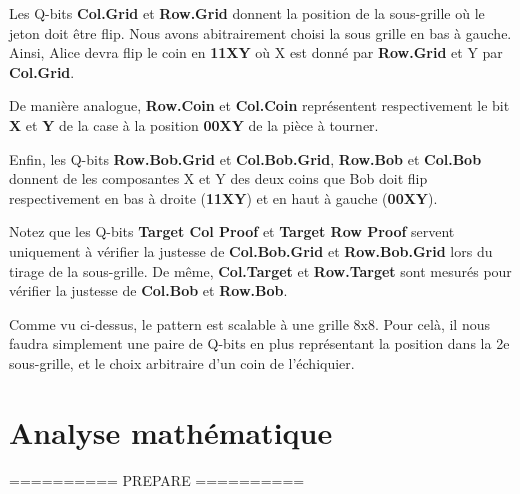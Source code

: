 \documentclass[12pt]{article}
\begin{document}
    \vspace{5mm}

    Les Q-bits \textbf{Col.Grid} et \textbf{Row.Grid} donnent la position de la sous-grille où le jeton doit être flip. Nous avons abitrairement choisi la sous grille en bas à gauche. Ainsi, Alice devra flip le coin en \textbf{11XY} où X est donné par \textbf{Row.Grid} et Y par \textbf{Col.Grid}.

    \vspace{5mm}

    De manière analogue, \textbf{Row.Coin} et \textbf{Col.Coin} représentent respectivement le bit \textbf{X} et \textbf{Y} de la case à la position \textbf{00XY} de la pièce à tourner.

    \vspace{5mm}

    Enfin, les Q-bits \textbf{Row.Bob.Grid} et \textbf{Col.Bob.Grid}, \textbf{Row.Bob} et \textbf{Col.Bob} donnent de les composantes X et Y des deux coins que Bob doit flip respectivement en bas à droite (\textbf{11XY}) et en haut à gauche (\textbf{00XY}).

    \vspace{5mm}
    Notez que les Q-bits \textbf{Target Col Proof} et \textbf{Target Row Proof} servent uniquement à vérifier la justesse de \textbf{Col.Bob.Grid} et \textbf{Row.Bob.Grid} lors du tirage de la sous-grille.
    De même, \textbf{Col.Target} et \textbf{Row.Target} sont mesurés pour vérifier la justesse de \textbf{Col.Bob} et \textbf{Row.Bob}.

    \vspace{10mm}
    Comme vu ci-dessus, le pattern est scalable à une grille 8x8. Pour celà, il nous faudra simplement une paire de Q-bits en plus représentant la position dans la 2e sous-grille, et le choix arbitraire d'un coin de l'échiquier.

    \section{Analyse mathématique}

    \centering ========== PREPARE ========== \\
\end{document}
